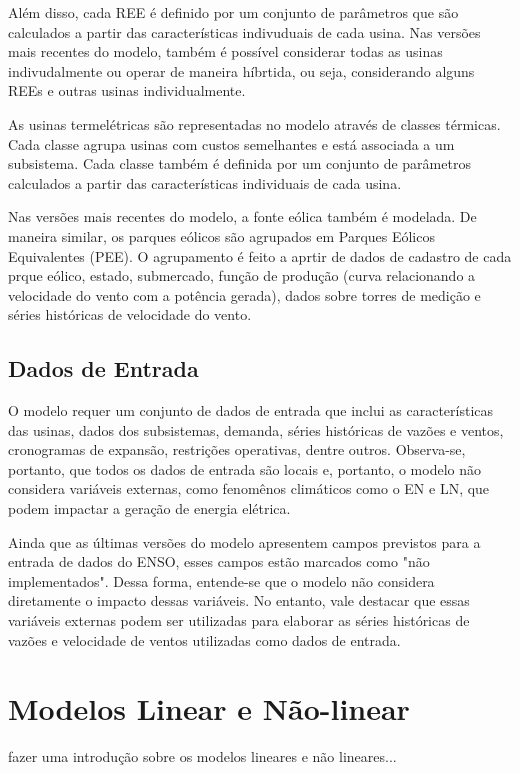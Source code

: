 Além disso, cada REE é definido por um conjunto de parâmetros que são calculados a partir das características indivuduais 
de cada usina. Nas versões mais recentes do modelo, também é possível considerar todas as usinas indivudalmente ou operar
de maneira híbrtida, ou seja, considerando alguns REEs e outras usinas individualmente.

As usinas termelétricas são representadas no modelo através de classes térmicas. Cada classe agrupa usinas com custos 
semelhantes e está associada a um subsistema. Cada classe também é definida por um conjunto de parâmetros calculados
a partir das características individuais de cada usina.

Nas versões mais recentes do modelo, a fonte eólica também é modelada. De maneira similar, os parques eólicos são agrupados
em Parques Eólicos Equivalentes (PEE). O agrupamento é feito a aprtir de dados de cadastro de cada prque eólico, estado,
submercado, função de produção (curva relacionando a velocidade do vento com a potência gerada), dados sobre torres de
medição e séries históricas de velocidade do vento.

\subsection{Dados de Entrada}
O modelo requer um conjunto de dados de entrada que inclui as características das usinas, dados dos subsistemas, demanda,
séries históricas de vazões e ventos, cronogramas de expansão, restrições operativas, dentre outros. Observa-se, portanto, 
que todos os dados de entrada são locais e, portanto, o modelo não considera variáveis externas, como fenomênos climáticos
como o EN e LN, que podem impactar a geração de energia elétrica. 

Ainda que as últimas versões do modelo apresentem campos previstos para a entrada de dados do ENSO, esses campos
estão marcados como "não implementados". Dessa forma, entende-se que o modelo não considera diretamente o impacto 
dessas variáveis. No entanto, vale destacar que essas variáveis externas podem ser utilizadas para elaborar as séries históricas de 
vazões e velocidade de ventos utilizadas como dados de entrada. 

\section{Modelos Linear e Não-linear}
fazer uma introdução sobre os modelos lineares e não lineares...

